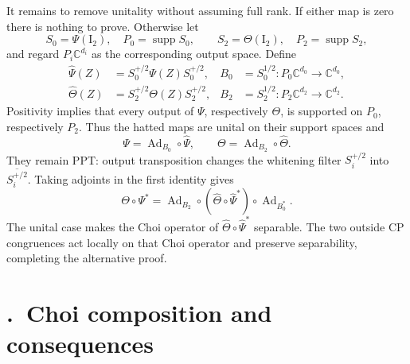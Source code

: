 \documentclass[aps,prl,reprint,superscriptaddress,nofootinbib]{revtex4-2}
\newcommand{\I}{\mathrm{I}}
\newcommand{\C}{\mathbb C}
\newcommand{\Ad}{\operatorname{Ad}}
\newcommand{\supp}{\operatorname{supp}}
\newcommand{\suppsection}[2]{%
 \refstepcounter{section}%
 \section*{\thesection.\ #1}%
 \label{sm:#2}}
\begin{document}
It remains to remove unitality without assuming full rank.  If either
map is zero there is nothing to prove.  Otherwise let
\begin{equation}
 S_0=\Psi(\I_2),\quad P_0=\supp S_0,\qquad
 S_2=\Theta(\I_2),\quad P_2=\supp S_2,
\label{sm:eq:outputsupports}
\end{equation}
and regard \(P_i\C^{d_i}\) as the corresponding output space.  Define
\begin{align}
 \widehat\Psi(Z)&=S_0^{+/2}\Psi(Z)S_0^{+/2},
 &B_0&=S_0^{1/2}:P_0\C^{d_0}\to\C^{d_0},
\nonumber\\
 \widehat\Theta(Z)&=S_2^{+/2}\Theta(Z)S_2^{+/2},
 &B_2&=S_2^{1/2}:P_2\C^{d_2}\to\C^{d_2}.
\label{sm:eq:whitenmiddle}
\end{align}
Positivity implies that every output of \(\Psi\), respectively
\(\Theta\), is supported on \(P_0\), respectively \(P_2\).  Thus the
hatted maps are unital on their support spaces and
\begin{equation}
 \Psi=\Ad_{B_0}\circ\widehat\Psi,\qquad
 \Theta=\Ad_{B_2}\circ\widehat\Theta.
\label{sm:eq:unwhitenmaps}
\end{equation}
They remain PPT: output transposition changes the whitening filter
\(S_i^{+/2}\) into \(\overline{S_i^{+/2}}\).  Taking adjoints in the first identity gives
\begin{equation}
 \Theta\circ\Psi^*
 =\Ad_{B_2}\circ(\widehat\Theta\circ\widehat\Psi^*)
  \circ\Ad_{B_0^*}.
\label{sm:eq:unwhitencomposition}
\end{equation}
The unital case makes the Choi operator of
\(\widehat\Theta\circ\widehat\Psi^*\) separable.  The two outside CP
congruences act locally on that Choi
operator and preserve separability, completing the alternative proof.

\suppsection{Choi composition and consequences}
{sec:choi}
\end{document}
